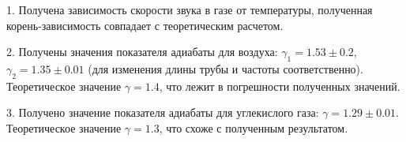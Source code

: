 \documentclass[a4paper,12pt]{article} %
\begin{document}
\hspace{5mm}
1. Получена зависимость скорости звука в газе от температуры, полученная корень-зависимость совпадает с теоретическим расчетом.

2. Получены значения показателя адиабаты для воздуха: $\gamma_1 = 1.53 \pm 0.2$, $\gamma_2 = 1.35 \pm 0.01$ (для изменения длины трубы и частоты соответственно). Теоретическое значение $\gamma = 1.4$, что лежит в погрешности полученных значений.

3. Получено значение показателя адиабаты для углекислого газа: $\gamma =  1.29 \pm 0.01$. Теоретическое значение  $\gamma = 1.3$, что схоже с полученным результатом.
\end{document}
